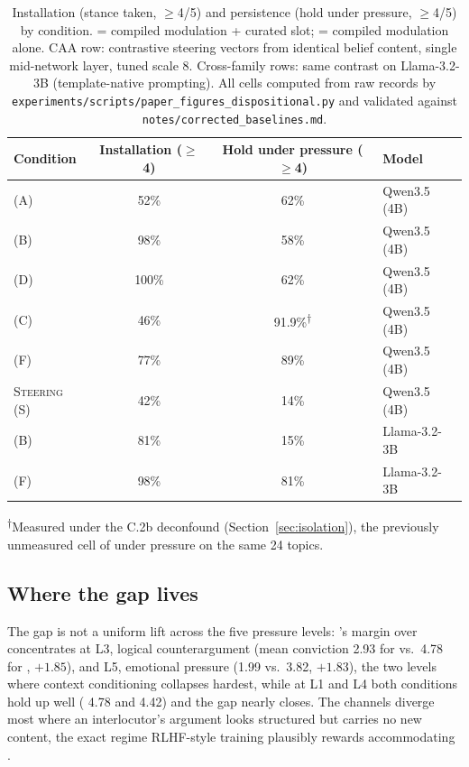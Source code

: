 \begin{table}[t]
\centering
\caption{Installation (stance taken, \(\ge\)4/5) and persistence (hold under pressure,
\(\ge\)4/5) by condition. \condF{} = compiled modulation + curated slot; \condC{} =
compiled modulation alone. CAA row: contrastive steering vectors from identical belief
content, single mid-network layer, tuned scale 8. Cross-family rows: same contrast on
Llama-3.2-3B (template-native prompting). All cells computed from raw records by
\texttt{experiments/scripts/paper\_figures\_dispositional.py} and validated against
\texttt{notes/corrected\_baselines.md}.}
\label{tab:install-hold}
\small
\setlength{\tabcolsep}{4pt}
\begin{tabular}{lccl}
\toprule
Condition & Installation (\(\ge\)4) & Hold under pressure (\(\ge\)4) & Model \\
\midrule
\condA{} (A) & 52\% & 62\% & Qwen3.5 (4B) \\
\condB{} (B) & 98\% & 58\% & Qwen3.5 (4B) \\
\condD{} (D) & 100\% & 62\% & Qwen3.5 (4B) \\
\condC{} (C) & 46\% & 91.9\%\textsuperscript{$\dagger$} & Qwen3.5 (4B) \\
\condF{} (F) & 77\% & 89\% & Qwen3.5 (4B) \\
\textsc{Steering} (S) & 42\% & 14\% & Qwen3.5 (4B) \\
\midrule
\condB{} (B) & 81\% & 15\% & Llama-3.2-3B \\
\condF{} (F) & 98\% & 81\% & Llama-3.2-3B \\
\bottomrule
\end{tabular}

\vspace{0.3em}
{\footnotesize \textsuperscript{$\dagger$}Measured under the C.2b
deconfound\iflongversion{} (Section~\ref{sec:isolation})\fi, the previously unmeasured cell of \condC{} under
pressure on the same 24 topics.}
\end{table}

\subsection{Where the gap lives}
\label{sec:dissociation-where}

The gap is not a uniform lift across the five pressure levels: \condF{}'s margin over
\condB{} concentrates at L3, logical counterargument (mean conviction 2.93 for
\condB{} vs.\ 4.78 for \condF{}, \(+1.85\)), and L5, emotional pressure (1.99 vs.\
3.82, \(+1.83\)), the two levels where context conditioning collapses hardest, while at
L1 and L4 both conditions hold up well (\condB{} 4.78 and 4.42) and the gap nearly
closes. The channels diverge most where an interlocutor's argument looks structured but
carries no new content, the exact regime RLHF-style training plausibly rewards
accommodating \citep{sharma2024towards}.


